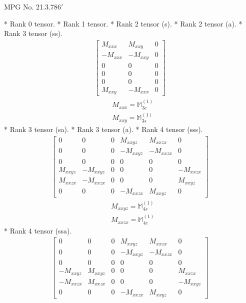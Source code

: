 \documentclass[fleqn,8pt,landscape]{jsarticle}
\begin{document}
\setcounter{MaxMatrixCols}{32}

\renewcommand{\tablename}{Table~}
\renewcommand{\figurename}{Figure~}
\begin{center}
\LARGE
MPG No. 21.3.78\quad$6'$
\end{center}
* Rank 0 tensor.
* Rank 1 tensor.
* Rank 2 tensor (s).
* Rank 2 tensor (a).
* Rank 3 tensor (ss).
\begin{align*}
\begin{bmatrix} M_{xxx} & M_{xxy} & 0 \\ - M_{xxx} & - M_{xxy} & 0 \\ 0 & 0 & 0 \\ 0 & 0 & 0 \\ 0 & 0 & 0 \\ M_{xxy} & - M_{xxx} & 0 \end{bmatrix}
\end{align*}
\begin{align*}
& M_{xxx} = \mathbb{M}_{3c}^{(1)} \\
& M_{xxy} = \mathbb{M}_{3s}^{(1)}
\end{align*}
* Rank 3 tensor (sa).
* Rank 3 tensor (a).
* Rank 4 tensor (sss).
\begin{align*}
\begin{bmatrix} 0 & 0 & 0 & M_{xxyz} & M_{xxzx} & 0 \\ 0 & 0 & 0 & - M_{xxyz} & - M_{xxzx} & 0 \\ 0 & 0 & 0 & 0 & 0 & 0 \\ M_{xxyz} & - M_{xxyz} & 0 & 0 & 0 & - M_{xxzx} \\ M_{xxzx} & - M_{xxzx} & 0 & 0 & 0 & M_{xxyz} \\ 0 & 0 & 0 & - M_{xxzx} & M_{xxyz} & 0 \end{bmatrix}
\end{align*}
\begin{align*}
& M_{xxyz} = \mathbb{M}_{4s}^{(1)} \\
& M_{xxzx} = \mathbb{M}_{4c}^{(1)}
\end{align*}
* Rank 4 tensor (ssa).
\begin{align*}
\begin{bmatrix} 0 & 0 & 0 & M_{xxyz} & M_{xxzx} & 0 \\ 0 & 0 & 0 & - M_{xxyz} & - M_{xxzx} & 0 \\ 0 & 0 & 0 & 0 & 0 & 0 \\ - M_{xxyz} & M_{xxyz} & 0 & 0 & 0 & M_{xxzx} \\ - M_{xxzx} & M_{xxzx} & 0 & 0 & 0 & - M_{xxyz} \\ 0 & 0 & 0 & - M_{xxzx} & M_{xxyz} & 0 \end{bmatrix}
\end{align*}
\end{document}
